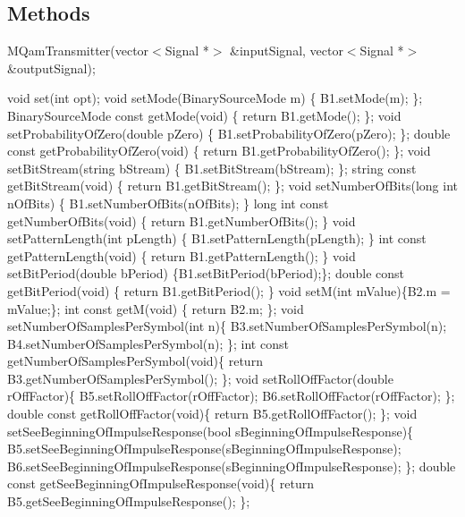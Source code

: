 \documentclass[a4paper]{article}
\begin{document}
\subsection*{Methods}

MQamTransmitter(vector$<$Signal *$>$ \&inputSignal, vector$<$Signal *$>$ \&outputSignal);
\bigbreak

void set(int opt);
\bigbreak
void setMode(BinarySourceMode m) \{ B1.setMode(m); \};
\bigbreak
BinarySourceMode const getMode(void) \{ return B1.getMode(); \};
\bigbreak
void setProbabilityOfZero(double pZero) \{ B1.setProbabilityOfZero(pZero); \};
\bigbreak
double const getProbabilityOfZero(void) \{ return B1.getProbabilityOfZero(); \};
\bigbreak
void setBitStream(string bStream) \{ B1.setBitStream(bStream); \};
\bigbreak
string const getBitStream(void) \{ return B1.getBitStream(); \};
\bigbreak
void setNumberOfBits(long int nOfBits) \{ B1.setNumberOfBits(nOfBits); \}
\bigbreak
long int const getNumberOfBits(void) \{ return B1.getNumberOfBits();  \}
\bigbreak
void setPatternLength(int pLength) \{ B1.setPatternLength(pLength); \}
\bigbreak
int const getPatternLength(void) \{ return B1.getPatternLength(); \}
\bigbreak
void setBitPeriod(double bPeriod) \{B1.setBitPeriod(bPeriod);\};
double const getBitPeriod(void) \{ return B1.getBitPeriod(); \}
\bigbreak
void setM(int mValue)\{B2.m = mValue;\};
int const getM(void) \{ return B2.m; \};
\bigbreak
\bigbreak
\bigbreak
void setNumberOfSamplesPerSymbol(int n)\{ B3.setNumberOfSamplesPerSymbol(n); B4.setNumberOfSamplesPerSymbol(n); \};
\bigbreak
int const getNumberOfSamplesPerSymbol(void)\{ return B3.getNumberOfSamplesPerSymbol(); \};
\bigbreak
void setRollOffFactor(double rOffFactor)\{ B5.setRollOffFactor(rOffFactor); B6.setRollOffFactor(rOffFactor); \};
\bigbreak
double const getRollOffFactor(void)\{ return B5.getRollOffFactor(); \};
\bigbreak
void setSeeBeginningOfImpulseResponse(bool sBeginningOfImpulseResponse)\{ B5.setSeeBeginningOfImpulseResponse(sBeginningOfImpulseResponse); B6.setSeeBeginningOfImpulseResponse(sBeginningOfImpulseResponse); \};
\bigbreak
double const getSeeBeginningOfImpulseResponse(void)\{ return B5.getSeeBeginningOfImpulseResponse(); \};
\bigbreak
\bigbreak
\bigbreak
\bigbreak
\end{document}
